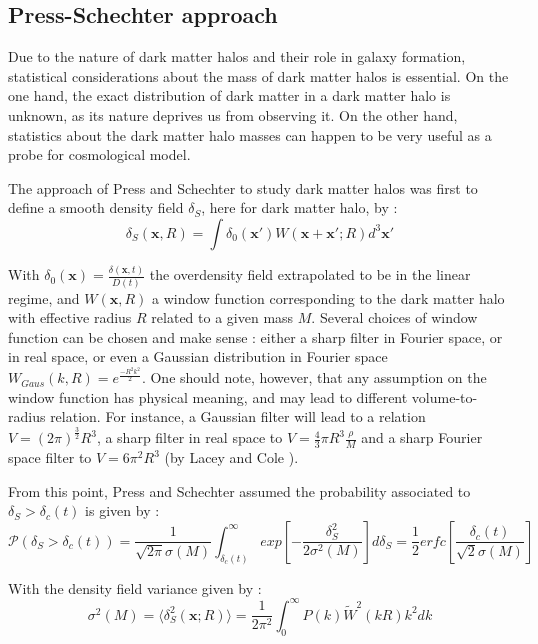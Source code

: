 \subsection{Press-Schechter approach}

Due to the nature of dark matter halos and their role in galaxy formation, statistical considerations about the mass of dark matter halos is essential. On the one hand, the exact distribution of dark matter in a dark matter halo is unknown, as its nature deprives us from observing it. On the other hand, statistics about the dark matter halo masses can happen to be very useful as a probe for cosmological model.

The approach of Press and Schechter \cite{PS} to study dark matter halos was first to define a smooth density field $\delta_S$, here for dark matter halo, by :
\begin{equation}
\label{Smooth Density Field}
\delta_S (\textbf{x}, R) =  \int \delta_0 (\textbf{x}') W(\textbf{x} + \textbf{x}' ; R) d^3 \textbf{x}'
\end{equation}

With $\delta_0(\textbf{x}) = \frac{\delta(\textbf{x},t)}{D(t)}$ the overdensity field extrapolated to be in the linear regime, and $W(\textbf{x},R)$ a window function corresponding to the dark matter halo with effective radius $R$ related to a given mass $M$. Several choices of window function can be chosen and make sense : either a sharp filter in Fourier space, or in real space, or even a Gaussian distribution in Fourier space $W_{Gaus} (k,R) = e^{\frac{-R^2 k^2}{2}}$.
One should note, however, that any assumption on the window function has physical meaning, and may lead to different volume-to-radius relation\cite{Maggiore}. For instance, a Gaussian filter will lead to a relation $V = (2\pi)^{\frac{3}{2}} R^3$, a sharp filter in real space to $V = \frac{4}{3}\pi R^3 \frac{\rho}{M}$ and a sharp Fourier space filter to $V = 6 \pi^2 R^3$ (by Lacey and Cole \cite{LaC}).

From this point, Press and Schechter assumed the probability associated to $\delta_S > \delta_c (t)$ is given by :
\begin{equation}
\label{PS proba}
\mathcal{P}(\delta_S > \delta_c (t)) = \frac{1}{\sqrt{2\pi}\sigma(M)} \int^\infty_{\delta_c(t)} exp\left[ - \frac{\delta_S^2}{2\sigma^2(M)}\right] d\delta_S = \frac{1}{2} erfc \left[ \frac{\delta_c(t)}{\sqrt{2}\sigma(M)} \right]
\end{equation}

With the density field variance given by :
\begin{equation}
\label{Var}
\sigma^2(M) = \langle \delta_S^2(\textbf{x};R)\rangle = \frac{1}{2\pi^2} \int_0^\infty P(k) \widetilde{W}^2(kR) k^2 dk
\end{equation}

